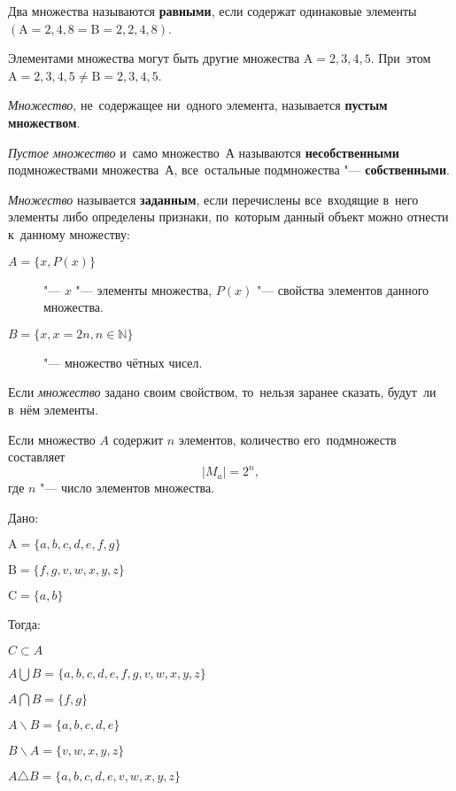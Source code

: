 \documentclass[]{scrartcl}
\begin{document}
Два множества называются \textbf{равными}, если содержат одинаковые элементы ${(\text{A}={2,4,8}=\text{B}={2,2,4,8})}$.

Элементами множества могут быть другие множества ${\text{A}={{2,3},{4,5}}}$. При~этом ${\text{A}={{2,3},{4,5}}\neq \text{B}= {2,3,4,5}}$.

\emph{Множество}, не~содержащее ни~одного элемента, называется \textbf{пустым множеством}.

\emph{Пустое множество} и~само множество~$А$ называются \textbf{несобственными} подмножествами множества~$А$, все~остальные подмножества "--- \textbf{собственными}.

\emph{Множество} называется \textbf{заданным}, если перечислены все~входящие в~него элементы либо определены признаки, по~которым данный объект можно отнести к~данному множеству:
\begin{description}
	\item[$A=\{x, P(x)\}$] "--- $x$ "--- элементы множества, $P(x)$ "--- свойства элементов данного множества.
	\item[$B=\{x, x=2n, n \in \mathbb{N}\}$] "--- множество чётных чисел.
\end{description}

Если \emph{множество} задано своим свойством, то~нельзя заранее сказать, будут~ли в~нём элементы.

Если множество $A$ содержит $n$ элементов, количество его~подмножеств составляет
\begin{equation}\label{n-submultitudes}
|M_{a}| = 2^n,
\end{equation}
где $n$ "--- число элементов множества.

\begin{Thexmpl}
	Дано:
	
	$\text{A}={\{a, b, c, d, e, f ,g\}}$
	
	$\text{B}={\{f, g, v, w, x, y, z\}}$
	
	$\text{C}={\{a, b\}}$
	
	Тогда:
	
	$C \subset A$
	
	$A \bigcup B = {\{a, b, c, d, e, f, g, v, w, x, y, z\}}$
	
	$A \bigcap B = {\{f, g\}}$
	
	$A \backslash B = {\{a, b, c, d, e\}}$
	
	$B \backslash A = {\{v, w, x, y, z\}}$
	
	$A \triangle B = {\{a, b, c, d, e, v, w, x, y, z\}}$
\end{Thexmpl}
\end{document}
